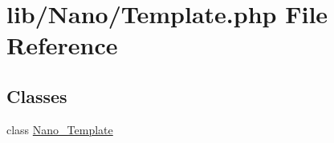 \hypertarget{Template_8php}{
\section{lib/Nano/Template.php File Reference}
\label{Template_8php}
}
\subsection*{Classes}
\begin{CompactItemize}
\item 
class \hyperlink{classNano__Template}{Nano\_\-Template}
\end{CompactItemize}
